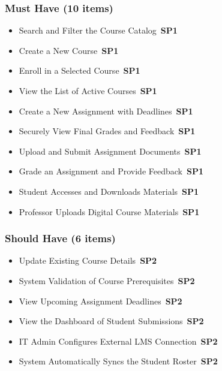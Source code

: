 \documentclass[12pt, a4paper]{article}
\newcommand{\sprintbadge}[1]{\colorbox{agileaccent}{\color{white}\tiny\bfseries\,SP#1\,}}
\begin{document}
\begin{tcolorbox}[enhanced,colback=agilecyan!5,colframe=agilecyan,boxrule=1pt,arc=5pt,title={\textbf{[2] Curriculum Module MVP}},fonttitle=\bfseries\color{white},attach boxed title to top left={yshift=-3mm,xshift=6mm},boxed title style={colback=agilecyan,arc=3pt}]
\subsubsection*{Must Have (10 items)}
\begin{itemize}[leftmargin=*,itemsep=3pt,label={$\bullet$}]
\item Search and Filter the Course Catalog \hfill\sprintbadge{1}
\item Create a New Course \hfill\sprintbadge{1}
\item Enroll in a Selected Course \hfill\sprintbadge{1}
\item View the List of Active Courses \hfill\sprintbadge{1}
\item Create a New Assignment with Deadlines \hfill\sprintbadge{1}
\item Securely View Final Grades and Feedback \hfill\sprintbadge{1}
\item Upload and Submit Assignment Documents \hfill\sprintbadge{1}
\item Grade an Assignment and Provide Feedback \hfill\sprintbadge{1}
\item Student Accesses and Downloads Materials \hfill\sprintbadge{1}
\item Professor Uploads Digital Course Materials \hfill\sprintbadge{1}
\end{itemize}

\subsubsection*{Should Have (6 items)}
\begin{itemize}[leftmargin=*,itemsep=3pt,label={$\bullet$}]
\item Update Existing Course Details \hfill\sprintbadge{2}
\item System Validation of Course Prerequisites \hfill\sprintbadge{2}
\item View Upcoming Assignment Deadlines \hfill\sprintbadge{2}
\item View the Dashboard of Student Submissions \hfill\sprintbadge{2}
\item IT Admin Configures External LMS Connection \hfill\sprintbadge{2}
\item System Automatically Syncs the Student Roster \hfill\sprintbadge{2}
\end{itemize}
\end{tcolorbox}
\end{document}
